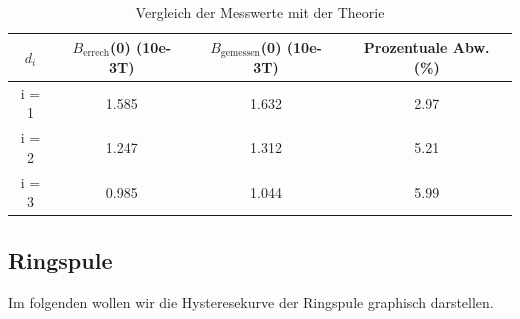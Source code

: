   \begin{table}
    \centering
    \caption{Vergleich der Messwerte mit der Theorie}
    \begin{tabular}{c c c c }
      \toprule
      $d_{i}$ & $B_{\text{errech}}$(0) (10e-3T) &  $B_{\text{gemessen}}$(0) (10e-3T) & Prozentuale Abw. (\%)\\
      \midrule
      i = 1  & 1.585 &         1.632  &     2.97 \\ 
      i = 2  & 1.247 &         1.312  &     5.21 \\ 
      i = 3  & 0.985 &         1.044  &     5.99 \\ 
      \bottomrule
    \end{tabular}
  \end{table}

\subsection{Ringspule}

Im folgenden wollen wir die Hysteresekurve der Ringspule graphisch darstellen.

